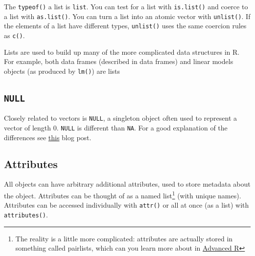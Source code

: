 \documentclass[]{book}
\newenvironment{Shaded}{\begin{snugshade}}{\end{snugshade}}
\newcommand{\KeywordTok}[1]{\textcolor[rgb]{0.13,0.29,0.53}{\textbf{#1}}}
\newcommand{\DecValTok}[1]{\textcolor[rgb]{0.00,0.00,0.81}{#1}}
\newcommand{\FloatTok}[1]{\textcolor[rgb]{0.00,0.00,0.81}{#1}}
\newcommand{\StringTok}[1]{\textcolor[rgb]{0.31,0.60,0.02}{#1}}
\newcommand{\CommentTok}[1]{\textcolor[rgb]{0.56,0.35,0.01}{\textit{#1}}}
\newcommand{\OperatorTok}[1]{\textcolor[rgb]{0.81,0.36,0.00}{\textbf{#1}}}
\newcommand{\NormalTok}[1]{#1}
\let\rmarkdownfootnote\footnote%
\def\footnote{\protect\rmarkdownfootnote}
\theoremstyle{definition}
\theoremstyle{definition}
\theoremstyle{definition}
\theoremstyle{remark}
\begin{document}
The \texttt{typeof()} a list is \texttt{list}. You can test for a list
with \texttt{is.list()} and coerce to a list with \texttt{as.list()}.
You can turn a list into an atomic vector with \texttt{unlist()}. If the
elements of a list have different types, \texttt{unlist()} uses the same
coercion rules as \texttt{c()}.

Lists are used to build up many of the more complicated data structures
in R. For example, both data frames (described in data frames) and
linear models objects (as produced by \texttt{lm()}) are lists

\subsection{\texorpdfstring{\texttt{NULL}}{NULL}}\label{null}

Closely related to vectors is \texttt{NULL}, a singleton object often
used to represent a vector of length 0. \texttt{NULL} is different than
\texttt{NA}. For a good explanation of the differences see
\href{https://www.r-bloggers.com/r-na-vs-null/}{this} blog post.

\subsection{Attributes}\label{attributes}

All objects can have arbitrary additional attributes, used to store
metadata about the object. Attributes can be thought of as a named
list\footnote{The reality is a little more complicated: attributes are
  actually stored in something called pairlists, which can you learn
  more about in \href{http://adv-r.had.co.nz}{Advanced R}} (with unique
names). Attributes can be accessed individually with \texttt{attr()} or
all at once (as a list) with \texttt{attributes()}.

\begin{Shaded}
\end{Shaded}
\end{document}
